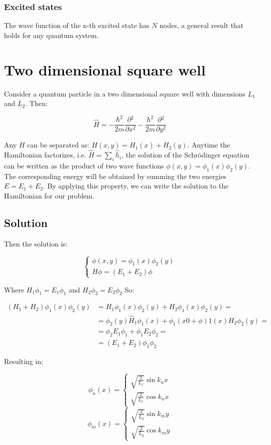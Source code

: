     \subsubsection{Excited states}
    The wave function of the n-th excited state has $N$ nodes, a general result that holds for any quantum system.

\section{Two dimensional square well}
Consider a quantum particle in a two dimensional square well with dimensions $L_1$ and $L_2$.
Then:

$$\hat{H} = -\frac{\hbar^2}{2m}\frac{\partial {^2}}{\partial {x^2}}-\frac{\hbar^2}{2m}\frac{\partial {^2}}{\partial {y^2}}$$

Any $H$ can be separated as: $H(x,y) = H_1(x) + H_2(y)$.
Anytime the Hamiltonian factorizes, i.e. $\hat{H}=\sum_i{\hat{h}_i}$, the solution of the Schr\"odinger equation can be written as the product of two wave functions $\phi(x,y)=\phi_1(x)\phi_2(y)$. 
The corresponding energy will be obtained by summing the two energies $E=E_1+E_2$. 
By applying this property, we can write the solution to the Hamiltonian for our problem.

  \subsection{Solution}
  Then the solution is:

  $$\begin{cases}\phi(x,y) = \phi_1(x)\phi_2(y)\\H\phi=(E_1+E_2)\phi\end{cases}$$

  Where $H_1\phi_1 = E_1\phi_1$  and $H_2\phi_2 = E_2\phi_2$
  So:

  \begin{align*}
    (H_1 + H_2)\phi_1(x)\phi_2(y) &= H_1\phi_1(x)\phi_2(y) + H_2\phi_1(x)\phi_2(y)=\\
                                  &= \phi_2(y)\hat{H}_1\phi_1(x)+\phi_1(x0+\phi)1(x)H_2\phi_2(y)=\\
                                  &= \phi_2 E_1\phi_1 + \phi_1E_2\phi_2=\\
                                  &=(E_1+E_2)\phi_1\phi_2
  \end{align*}

 Resulting in:

  $$\phi_n(x) = \begin{cases}\sqrt{\frac{2}{L_{x}}} \sin k_n x\\ \sqrt{\frac{2}{L_{x}}} \cos k_n x\end{cases}$$
  $$\phi_m(x) = \begin{cases}\sqrt{\frac{2}{L_{y}}} \sin k_m y\\ \sqrt{\frac{2}{L_{y}}} \cos k_m y\end{cases}$$

